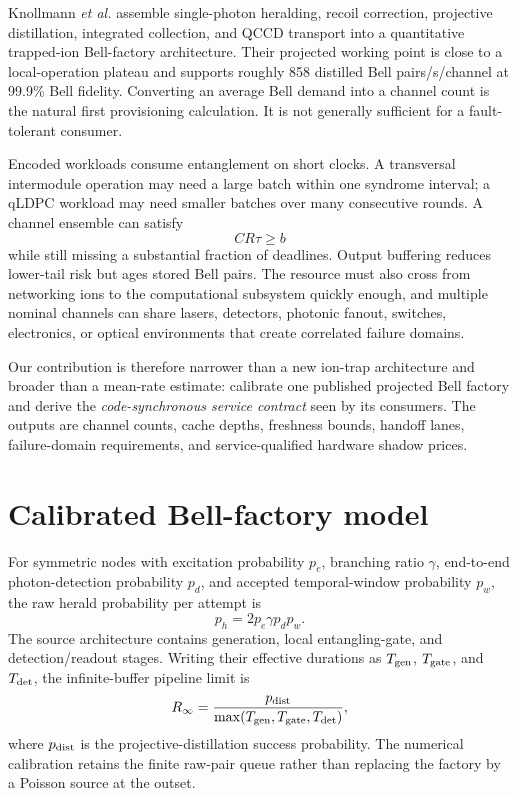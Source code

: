 \documentclass[aps,prx,reprint,superscriptaddress,nofootinbib,longbibliography,floatfix]{revtex4-2}
\begin{document}
Knollmann \emph{et al.} assemble single-photon heralding, recoil correction, projective distillation, integrated collection, and QCCD transport into a quantitative trapped-ion Bell-factory architecture. Their projected working point is close to a local-operation plateau and supports roughly 858 distilled Bell pairs/s/channel at 99.9\% Bell fidelity. Converting an average Bell demand into a channel count is the natural first provisioning calculation. It is not generally sufficient for a fault-tolerant consumer.

Encoded workloads consume entanglement on short clocks. A transversal intermodule operation may need a large batch within one syndrome interval; a qLDPC workload may need smaller batches over many consecutive rounds. A channel ensemble can satisfy
\begin{equation}
CR\tau\ge b
\end{equation}
while still missing a substantial fraction of deadlines. Output buffering reduces lower-tail risk but ages stored Bell pairs. The resource must also cross from networking ions to the computational subsystem quickly enough, and multiple nominal channels can share lasers, detectors, photonic fanout, switches, electronics, or optical environments that create correlated failure domains.

Our contribution is therefore narrower than a new ion-trap architecture and broader than a mean-rate estimate: calibrate one published projected Bell factory and derive the \emph{code-synchronous service contract} seen by its consumers. The outputs are channel counts, cache depths, freshness bounds, handoff lanes, failure-domain requirements, and service-qualified hardware shadow prices.

\section{Calibrated Bell-factory model}
For symmetric nodes with excitation probability $p_e$, branching ratio $\gamma$, end-to-end photon-detection probability $p_d$, and accepted temporal-window probability $p_w$, the raw herald probability per attempt is
\begin{equation}
p_h=2p_e\gamma p_dp_w.
\end{equation}
The source architecture contains generation, local entangling-gate, and detection/readout stages. Writing their effective durations as $T_{\rm gen}$, $T_{\rm gate}$, and $T_{\rm det}$, the infinite-buffer pipeline limit is
\begin{equation}
R_\infty=\frac{p_{\rm dist}}{\max(T_{\rm gen},T_{\rm gate},T_{\rm det})},
\end{equation}
where $p_{\rm dist}$ is the projective-distillation success probability. The numerical calibration retains the finite raw-pair queue rather than replacing the factory by a Poisson source at the outset.
\end{document}
